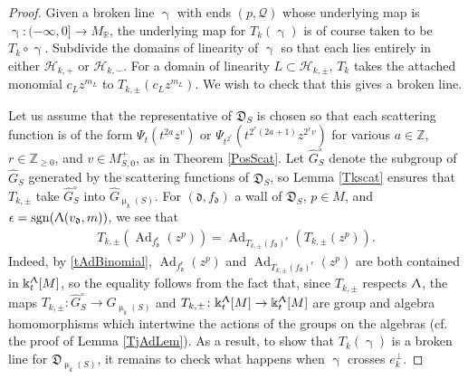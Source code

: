 \documentclass{amsart}
\DeclareMathOperator{\sign}{sgn}
\DeclareMathOperator{\Ad}{Ad}
\let\bb=\mathbb
\let\rar=\rightarrow
\let\f=\mathfrak
\let\s=\mathcal
\newcommand {\kk} {\Bbbk}
\newcommand {\sQ} {\mathcal{Q}}
\renewcommand{\gamma}{\upgamma}
\renewcommand{\Lambda}{\Uplambda}
\renewcommand{\mu}{\upmu}
\theoremstyle{plain}%
\theoremstyle{definition}
\theoremstyle{remark}
\begin{document}
\begin{proof}
Given a broken line $\gamma$ with ends $(p,\sQ)$ whose underlying map is $\gamma\colon (-\infty,0]\rar M_{\bb{R}}$, the underlying map for $T_k(\gamma)$ is of course taken to be $T_k\circ \gamma$.  Subdivide the domains of linearity of $\gamma$ so that each lies entirely in either $\s{H}_{k,+}$ or $\s{H}_{k,-}$.  For a domain of linearity $L\subset \s{H}_{k,\pm}$, $T_k$ takes the attached monomial $c_Lz^{m_L}$ to $T_{k,\pm}(c_Lz^{m_L})$.  We wish to check that this gives a broken line.

Let us assume that the representative of $\f{D}_S$ is chosen so that each scattering function is of the form $\Psi_t(t^{2a}z^v)$ or $\Psi_{t^{2^r}}(t^{2^r(2a+1)}z^{2^rv})$ for various $a\in \bb{Z}$, $r\in \bb{Z}_{\geq 0}$, and $v\in M_{S,0}^+$, as in Theorem \ref{PosScat}.  Let $\hat{G}_S^{\circ}$ denote the subgroup of $\hat{G}_S$ generated by the scattering functions of $\f{D}_S$, so Lemma \ref{Tkscat} ensures that $T_{k,\pm}$ take $\hat{G}_S^{\circ}$ into $\hat{G}_{\mu_k(S)}$.  For $(\f{d},f_{\f{d}})$ a wall of $\f{D}_S$, $p\in M$, and $\epsilon=\sign(\Lambda(v_{\f{d}},m))$, we see that
\begin{align}\label{TkAd}
    T_{k,\pm}(\Ad_{f_{\f{d}}^{\epsilon}
    }(z^p)) = \Ad_{T_{k,\pm}(f_{\f{d}})^{\epsilon}}(T_{k,\pm}(z^p)).
\end{align}
Indeed, by \eqref{tAdBinomial}, $\Ad_{f_{\f{d}}^{\epsilon}}(z^p)$ and $\Ad_{T_{k,\pm}(f_{\f{d}})^{\epsilon}}(z^p)$ are both contained in $\kk_t^{\Lambda}[M]$, so the equality follows from the fact that, since $T_{k,\pm}$ respects $\Lambda$, the maps $T_{k,\pm}\colon \hat{G}_S^{\circ}\rar \hat{G}_{\mu_k(S)}$ and $T_{k,\pm}\colon \kk_t^{\Lambda}[M]\rar \kk_t^{\Lambda}[M]$ are group and algebra homomorphisms which intertwine the actions of the groups on the algebras (cf. the proof of Lemma \ref{TjAdLem}).  As a result, to show that $T_k(\gamma)$ is a broken line for $\f{D}_{\mu_k(S)}$, it remains to check what happens when $\gamma$ crosses $e_k^{\perp}$.




\end{proof}
\end{document}
